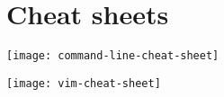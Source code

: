\documentclass{article}
\begin{document}
\section{Cheat sheets}

\begin{center}
    \texttt{[image: command-line-cheat-sheet]}
\end{center}

\begin{center}
    \texttt{[image: vim-cheat-sheet]}
\end{center}


\end{document}
